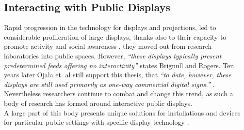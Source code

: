 
\subsection{Interacting with Public Displays}
Rapid progression in the technology for displays and projections, led to considerable proliferation of large displays, thanks also to their capacity to promote activity and social awareness \cite{Huang:2003}, they moved out from research laboratories into public spaces. 
However, \emph{``these displays typically present predetermined feeds offering no interactivity''} \cite{Brignull:2003} states Brignull and Rogers. 
Ten years later Ojala et. al still support this thesis, that \emph{``to date, however, these displays are still used primarily as one-way commercial digital signs.''} \cite{Ojala:2012:MIP:2225044.2225065}. \\

Nevertheless researchers continue to combat and change this trend, as such a body of research has formed around interactive public displays. \\

A large part of this body presents unique  solutions for installations and devices for particular public settings with specific display technology \cite{Schieck:2012:AEM:2393132.2393141}.\\


